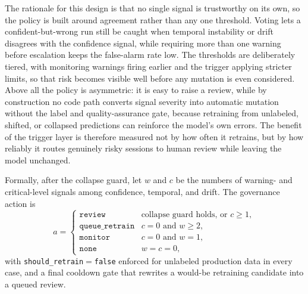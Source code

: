 The rationale for this design is that no single signal is trustworthy on its own, so the policy is built around agreement rather than any one threshold. Voting lets a confident-but-wrong run still be caught when temporal instability or drift disagrees with the confidence signal, while requiring more than one warning before escalation keeps the false-alarm rate low. The thresholds are deliberately tiered, with monitoring warnings firing earlier and the trigger applying stricter limits, so that risk becomes visible well before any mutation is even considered. Above all the policy is asymmetric: it is easy to raise a review, while by construction no code path converts signal severity into automatic mutation without the label and quality-assurance gate, because retraining from unlabeled, shifted, or collapsed predictions can reinforce the model's own errors. The benefit of the trigger layer is therefore measured not by how often it retrains, but by how reliably it routes genuinely risky sessions to human review while leaving the model unchanged.

Formally, after the collapse guard, let $w$ and $c$ be the numbers of warning- and critical-level signals among confidence, temporal, and drift. The governance action is
\[
a=\begin{cases}
\texttt{review} & \text{collapse guard holds, or } c\ge 1,\\
\texttt{queue\_retrain} & c=0 \text{ and } w\ge 2,\\
\texttt{monitor} & c=0 \text{ and } w=1,\\
\texttt{none} & w=c=0,
\end{cases}
\]
with \texttt{should\_retrain}$=$\texttt{false} enforced for unlabeled production data in every case, and a final cooldown gate that rewrites a would-be retraining candidate into a queued review.

